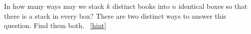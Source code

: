\documentclass{book}
\begin{document}
\setcounter{project}{131}
\addtocounter{project}{-1}
\begin{activity}[]\label{brokenpermutation}
\hypertarget{p-913}{}%
In how many ways may we stack \(k\) distinct books into \(n\) identical boxes so that there is a stack in every box? There are two distinct ways to answer this question.  Find them both.%
~\hfill{\tiny\hyperlink{a-131}{[hint]}\hypertarget{q-131}{}}\end{activity}
\end{document}
